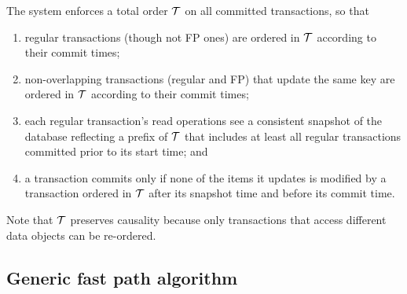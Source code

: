 The system enforces a total order ${\cal T}$ on all committed transactions, so that
\begin{enumerate}
    \setlength{\itemsep}{0pt}
    \setlength{\parskip}{0pt}
    \setlength{\parsep}{2pt}  
\item
regular transactions (though not FP ones) are ordered in ${\cal T}$  according to their commit times;
\item
non-overlapping transactions (regular and FP) that update the same key are ordered in ${\cal T}$  according to their commit times;
\item
each regular transaction's read operations see a consistent snapshot of the database reflecting 
a prefix of  ${\cal T}$ that includes at least all regular transactions committed prior to
its start time; and 
\item
 a transaction commits only if none of the items it updates is modified by a transaction ordered in ${\cal T}$ after
 its snapshot time 
 and before its commit time.
 \end{enumerate}

Note that  ${\cal T}$  preserves causality because 
only transactions that  access different data objects can be re-ordered.


\subsection{Generic fast path algorithm}
\label{ssec:fast-algorithm}



